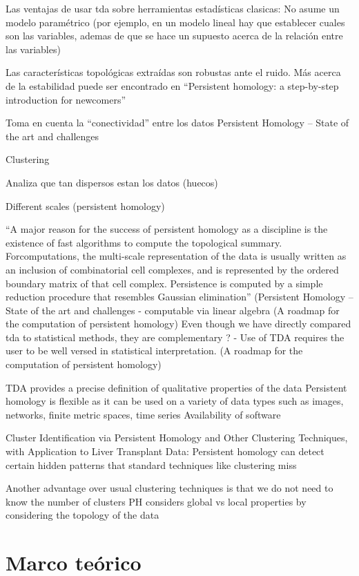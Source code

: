 \documentclass[a4paper,11pt]{article}
\begin{document}
Las ventajas de usar tda sobre herramientas estadísticas clasicas:
No asume un modelo paramétrico (por ejemplo, en un modelo lineal hay que establecer cuales son las variables, ademas de que se hace un supuesto acerca de la relación entre las variables)

Las características topológicas extraídas son robustas ante el ruido. Más acerca de la estabilidad puede ser encontrado en “Persistent homology: a step-by-step introduction for newcomers”

Toma en cuenta la “conectividad” entre los datos Persistent Homology – State of the art and challenges 

Clustering

Analiza que tan dispersos estan los datos (huecos)

Different scales (persistent homology)

“A major reason for the success of persistent homology as a discipline
is the existence of fast algorithms to compute the topological summary. Forcomputations, the multi-scale representation of the data is usually written as an inclusion of combinatorial cell complexes, and is represented by the ordered boundary matrix of that cell complex. Persistence is computed by a simple reduction procedure that resembles Gaussian elimination” (Persistent Homology – State of the art and challenges - computable via linear algebra (A roadmap for the computation of persistent homology)
Even though we have directly compared tda to statistical methods, they are complementary ? - Use of TDA requires the user to be well versed in statistical interpretation. (A roadmap for the computation of persistent homology)

TDA provides a precise definition of qualitative properties of the data
Persistent homology is flexible as it can be used on a variety of data types such as images, networks, finite metric spaces, time series
Availability of software

Cluster Identification via Persistent Homology and Other Clustering Techniques, with Application to Liver Transplant Data: Persistent homology can detect certain hidden patterns that standard techniques like clustering miss

Another advantage over usual clustering techniques is that we do not need to know the number of clusters
PH considers global vs local properties by considering the topology of the data


\section{Marco teórico}
\end{document}
